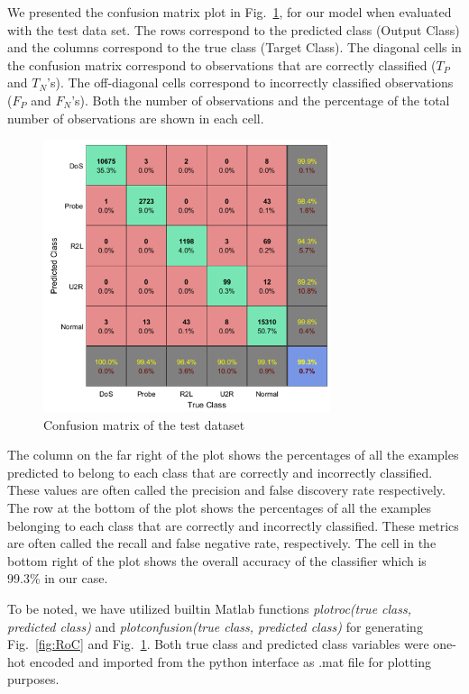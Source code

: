 \documentclass[runningheads]{llncs}
\newcommand{\fig}[1]{Fig.~\ref{#1}}
\begin{document}
We presented the confusion matrix plot  in \fig{fig:confusionmatrix}, for our model when evaluated with the test data set. The rows correspond to the predicted class (Output Class) and the columns correspond to the true class (Target Class).
The diagonal cells in the confusion matrix correspond to observations that are correctly classified ($T_P$ and $T_N$'s). The off-diagonal cells correspond to incorrectly classified observations ($F_P$ and $F_N$'s). Both the number of observations and the percentage of the total number of observations are shown in each cell.
 \begin{figure}
      \centering
\includegraphics[width=0.75\textwidth]{Figures/Confusion_NIDS.png}
\caption{Confusion matrix of the test dataset}
      \label{fig:confusionmatrix}
    \end{figure}
    

The column on the far right of the plot shows the percentages of all the examples predicted to belong to each class that are correctly and incorrectly classified. These values are often called the precision and false discovery rate respectively. The row at the bottom of the plot shows the percentages of all the examples belonging to each class that are correctly and incorrectly classified. These metrics are often called the recall and false negative rate, respectively. The cell in the bottom right of the plot shows the overall accuracy of the classifier which is 99.3\% in our case. 



To be noted, we have utilized builtin Matlab functions \emph{plotroc(true class, predicted class)} and \emph{plotconfusion(true class, predicted class)} for generating \fig{fig:RoC} and \fig{fig:confusionmatrix}. Both true class and predicted class variables were one-hot encoded and imported from the python interface as .mat file for plotting purposes.
\end{document}
